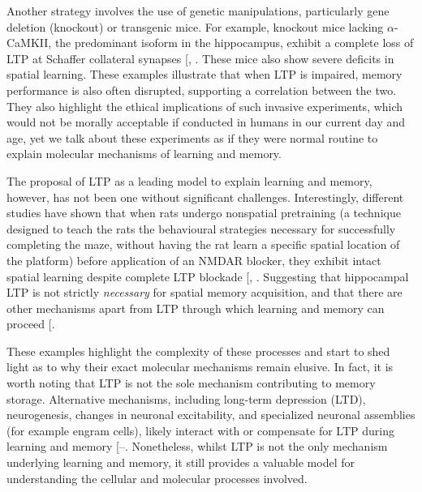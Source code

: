 \documentclass[
  11pt,
  letterpaper,
]{scrreprt}
\begin{document}
Another strategy involves the use of genetic manipulations, particularly
gene deletion (knockout) or transgenic mice. For example, knockout mice
lacking \(\alpha\)-CaMKII, the predominant isoform in the hippocampus,
exhibit a complete loss of LTP at Schaffer collateral synapses
{[},
\citeproc{ref-incontro2018CaMKII}{47}{]}. These mice also show severe
deficits in spatial learning. These examples illustrate that when LTP is
impaired, memory performance is also often disrupted, supporting a
correlation between the two. They also highlight the ethical
implications of such invasive experiments, which would not be morally
acceptable if conducted in humans in our current day and age, yet we
talk about these experiments as if they were normal routine to explain
molecular mechanisms of learning and memory.

The proposal of LTP as a leading model to explain learning and memory,
however, has not been one without significant challenges. Interestingly,
different studies have shown that when rats undergo nonspatial
pretraining (a technique designed to teach the rats the behavioural
strategies necessary for successfully completing the maze, without
having the rat learn a specific spatial location of the platform) before
application of an NMDAR blocker, they exhibit intact spatial learning
despite complete LTP blockade
{[},
\citeproc{ref-saucier1995Spatial}{49}{]}. Suggesting that hippocampal
LTP is not strictly \emph{necessary} for spatial memory acquisition, and
that there are other mechanisms apart from LTP through which learning
and memory can proceed {[}\citeproc{ref-moser2000Pretraining}{50}{]}.

These examples highlight the complexity of these processes and start to
shed light as to why their exact molecular mechanisms remain elusive. In
fact, it is worth noting that LTP is not the sole mechanism contributing
to memory storage. Alternative mechanisms, including long-term
depression (LTD), neurogenesis, changes in neuronal excitability, and
specialized neuronal assemblies (for example engram cells), likely
interact with or compensate for LTP during learning and memory
{[}--\citeproc{ref-luis2022Understanding}{54}{]}.
Nonetheless, whilst LTP is not the only mechanism underlying learning
and memory, it still provides a valuable model for understanding the
cellular and molecular processes involved.
\end{document}
